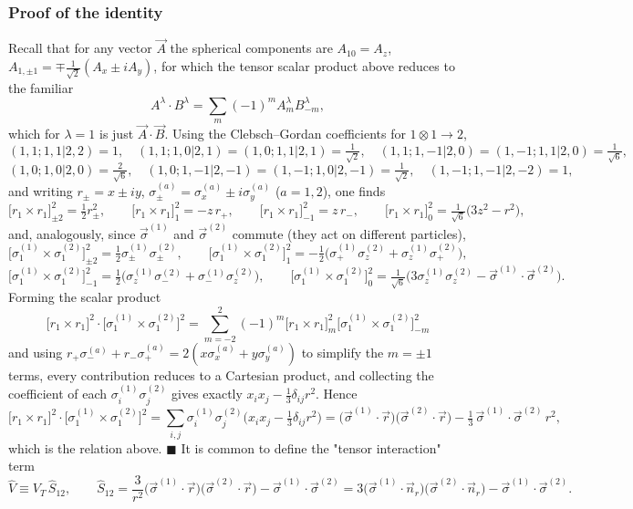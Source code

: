 \documentclass[11pt,a4paper]{article}
\newcommand{\op}[1]{\hat{#1}}
\begin{document}
\subsubsection*{Proof of the identity}
Recall that for any vector $\vec A$ the spherical components are $A_{10}=A_z$, $A_{1,\pm1}=\mp\tfrac1{\sqrt2}(A_x\pm iA_y)$, for which the tensor scalar product above reduces to the familiar
\[
A^\lambda\cdot B^\lambda=\sum_m(-1)^m A^\lambda_m B^\lambda_{-m},
\]
which for $\lambda=1$ is just $\vec A\cdot\vec B$. Using the Clebsch--Gordan coefficients for $1\otimes1\to2$,
\[
(1,1;1,1|2,2)=1,\quad (1,1;1,0|2,1)=(1,0;1,1|2,1)=\tfrac1{\sqrt2},\quad
(1,1;1,-1|2,0)=(1,-1;1,1|2,0)=\tfrac1{\sqrt6},
\]
\[
(1,0;1,0|2,0)=\tfrac2{\sqrt6},\quad (1,0;1,-1|2,-1)=(1,-1;1,0|2,-1)=\tfrac1{\sqrt2},\quad (1,-1;1,-1|2,-2)=1,
\]
and writing $r_\pm=x\pm iy$, $\sigma^{(a)}_\pm=\sigma^{(a)}_x\pm i\sigma^{(a)}_y$ ($a=1,2$), one finds
\[
\big[r_1\times r_1\big]^2_{\pm2}=\tfrac12 r_\pm^2,\qquad
\big[r_1\times r_1\big]^2_{1}=-z\,r_+,\qquad
\big[r_1\times r_1\big]^2_{-1}=z\,r_-,\qquad
\big[r_1\times r_1\big]^2_{0}=\tfrac1{\sqrt6}\big(3z^2-r^2\big),
\]
and, analogously, since $\vec\sigma^{(1)}$ and $\vec\sigma^{(2)}$ commute (they act on different particles),
\[
\big[\sigma^{(1)}_1\times\sigma^{(2)}_1\big]^2_{\pm2}=\tfrac12\sigma^{(1)}_\pm\sigma^{(2)}_\pm,\qquad
\big[\sigma^{(1)}_1\times\sigma^{(2)}_1\big]^2_{1}=-\tfrac12\big(\sigma^{(1)}_+\sigma^{(2)}_z+\sigma^{(1)}_z\sigma^{(2)}_+\big),
\]
\[
\big[\sigma^{(1)}_1\times\sigma^{(2)}_1\big]^2_{-1}=\tfrac12\big(\sigma^{(1)}_z\sigma^{(2)}_-+\sigma^{(1)}_-\sigma^{(2)}_z\big),\qquad
\big[\sigma^{(1)}_1\times\sigma^{(2)}_1\big]^2_{0}=\tfrac1{\sqrt6}\big(3\sigma^{(1)}_z\sigma^{(2)}_z-\vec\sigma^{(1)}\!\cdot\vec\sigma^{(2)}\big).
\]
Forming the scalar product
\[
\big[r_1\times r_1\big]^2\cdot\big[\sigma^{(1)}_1\times\sigma^{(2)}_1\big]^2
=\sum_{m=-2}^{2}(-1)^m\big[r_1\times r_1\big]^2_m\big[\sigma^{(1)}_1\times\sigma^{(2)}_1\big]^2_{-m}
\]
and using $r_+\sigma^{(a)}_-+r_-\sigma^{(a)}_+=2(x\sigma^{(a)}_x+y\sigma^{(a)}_y)$ to simplify the $m=\pm1$ terms, every contribution reduces to a Cartesian product, and collecting the coefficient of each $\sigma^{(1)}_i\sigma^{(2)}_j$ gives exactly $x_ix_j-\tfrac13\delta_{ij}r^2$. Hence
\[
\big[r_1\times r_1\big]^2\cdot\big[\sigma^{(1)}_1\times\sigma^{(2)}_1\big]^2
=\sum_{i,j}\sigma^{(1)}_i\sigma^{(2)}_j\Big(x_ix_j-\tfrac13\delta_{ij}r^2\Big)
=\big(\vec\sigma^{(1)}\!\cdot\vec r\big)\big(\vec\sigma^{(2)}\!\cdot\vec r\big)-\tfrac13\,\vec\sigma^{(1)}\!\cdot\vec\sigma^{(2)}\,r^2,
\]
which is the relation above. $\blacksquare$
It is common to define the "tensor interaction" term
\[
\op V\equiv V_T\,\op S_{12},
\qquad
\op S_{12}=\frac{3}{r^2}\big(\vec\sigma^{(1)}\!\cdot\vec r\big)\big(\vec\sigma^{(2)}\!\cdot\vec r\big)
-\vec\sigma^{(1)}\!\cdot\vec\sigma^{(2)}
=3\big(\vec\sigma^{(1)}\!\cdot\vec n_r\big)\big(\vec\sigma^{(2)}\!\cdot\vec n_r\big)
-\vec\sigma^{(1)}\!\cdot\vec\sigma^{(2)} .
\]
\end{document}
